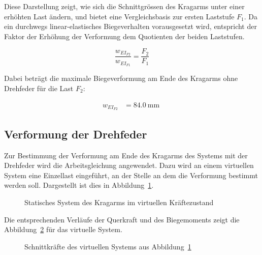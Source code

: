 \documentclass[
  11pt,
  letterpaper,
]{scrreprt}
\begin{document}
Diese Darstellung zeigt, wie sich die Schnittgrössen des Kragarms unter
einer erhöhten Last ändern, und bietet eine Vergleichsbasis zur ersten
Laststufe \(F_1\). Da ein durchwegs linear-elastisches Biegeverhalten
vorausgesetzt wird, entspricht der Faktor der Erhöhung der Verformung
dem Quotienten der beiden Laststufen.

\[
\frac{w_{EI_{F2}}}{w_{EI_{F1}}} = \frac{F_2}{F_1}
\]

Dabei beträgt die maximale Biegeverformung am Ende des Kragarms ohne
Drehfeder für die Last \(F_2\):

$$
\begin{aligned}
w_{EI_{F2}} &= 84.0\ \mathrm{mm} \;
\end{aligned}
$$

\subsection{Verformung der Drehfeder}\label{verformung-der-drehfeder}

Zur Bestimmung der Verformung am Ende des Kragarms des Systems mit der
Drehfeder wird die Arbeitsgleichung angewendet. Dazu wird an einem
virtuellen System eine Einzellast eingeführt, an der Stelle an dem die
Verformung bestimmt werden soll. Dargestellt ist dies in
Abbildung~\ref{fig-kragarm-sys-virtuell}.

\begin{figure}[H]


\caption{\label{fig-kragarm-sys-virtuell}Statisches System des Kragarms
im virtuellen Kräftezustand}

\end{figure}%

Die entsprechenden Verläufe der Querkraft und des Biegemoments zeigt die
Abbildung~\ref{fig-sk-kragarm-virtuell} für das virtuelle System.

\begin{figure}[H]


\caption{\label{fig-sk-kragarm-virtuell}Schnittkräfte des virtuellen
Systems aus Abbildung~\ref{fig-kragarm-sys-virtuell}}

\end{figure}%
\end{document}
